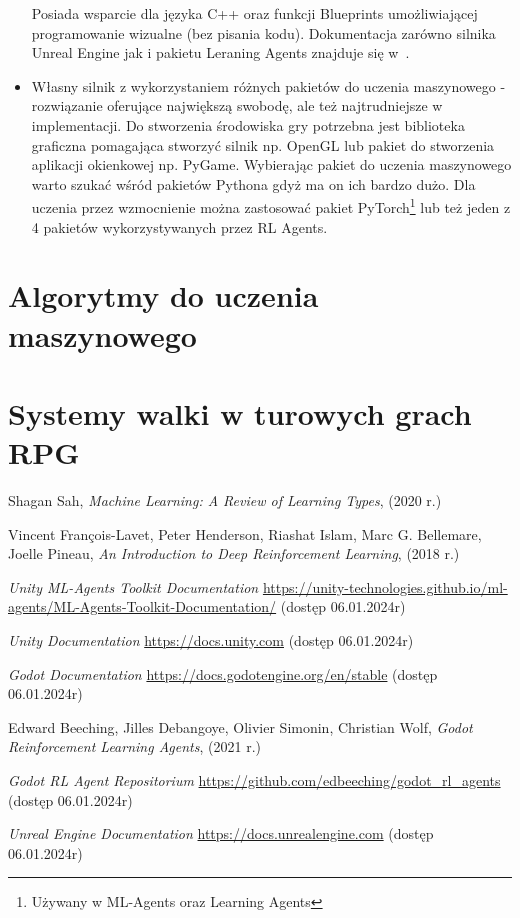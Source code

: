 \documentclass{SGGW-thesis}
\begin{document}
\begin{itemize}
{  Posiada wsparcie dla języka C++ oraz funkcji Blueprints umożliwiającej programowanie wizualne (bez pisania kodu). Dokumentacja zarówno silnika Unreal Engine jak i pakietu Leraning Agents znajduje się w~\cite{UnrealDocs}.}
  \item{Własny silnik z wykorzystaniem różnych pakietów do uczenia maszynowego - rozwiązanie oferujące największą swobodę, ale też najtrudniejsze w implementacji. Do stworzenia środowiska gry potrzebna jest biblioteka graficzna pomagająca stworzyć silnik np. OpenGL
  lub pakiet do stworzenia aplikacji okienkowej np. PyGame. Wybierając pakiet do uczenia maszynowego warto szukać wśród pakietów Pythona gdyż ma on ich bardzo dużo. Dla uczenia przez wzmocnienie można zastosować pakiet PyTorch\footnote{Używany w ML-Agents oraz Learning Agents}
  lub też jeden z 4 pakietów wykorzystywanych przez RL Agents.}
\end{itemize}

\section{Algorytmy do uczenia maszynowego}
\label{algorithms}

\section{Systemy walki w turowych grach RPG}

\begin{thebibliography}{9}
  Shagan Sah,
  \textit{Machine Learning: A Review of Learning Types},
  (2020 r.)

  Vincent François-Lavet, Peter Henderson, Riashat Islam, Marc G. Bellemare, Joelle Pineau,
  \textit{An Introduction to Deep Reinforcement Learning},
  (2018 r.)

  \textit{Unity ML-Agents Toolkit Documentation} 
  \url{https://unity-technologies.github.io/ml-agents/ML-Agents-Toolkit-Documentation/}
  (dostęp 06.01.2024r)

  \textit{Unity Documentation}
  \url{https://docs.unity.com}
  (dostęp 06.01.2024r)

  \textit{Godot Documentation}
  \url{https://docs.godotengine.org/en/stable}
  (dostęp 06.01.2024r)

  Edward Beeching, Jilles Debangoye, Olivier Simonin, Christian Wolf,
  \textit{Godot Reinforcement Learning Agents},
  (2021 r.)

  \textit{Godot RL Agent Repositorium}
  \url{https://github.com/edbeeching/godot_rl_agents}
  (dostęp 06.01.2024r)

  \textit{Unreal Engine Documentation}
  \url{https://docs.unrealengine.com}
  (dostęp 06.01.2024r)
  
\end{thebibliography}

\beforelastpage
\end{document}
